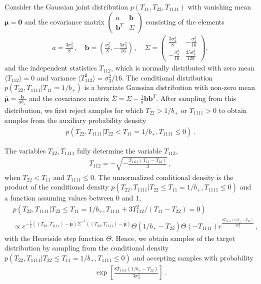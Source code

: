 \documentclass[a4paper, 11pt]{article}
\begin{document}
Consider the Gaussian joint distribution $p(T_{11},T_{22},T_{1111})$ with vanishing mean $\bm{\mu}=\bm{0}$ and the covariance matrix $\begin{pmatrix} a & \bm{b} \\ \bm{b}^T & \Sigma \end{pmatrix}$ consisting of the elements
\begin{align}
a=\frac{3 \sigma_2^2}{8}\,, \quad
\bm{b}=\left(\frac{\sigma_2^2}{8}, -\frac{5 \sigma_3^2}{16}\right)\,,\quad
\Sigma = \begin{pmatrix} \frac{3 \sigma_2^2}{8} & -\frac{\sigma_3^2}{16} \\ -\frac{\sigma_3^2}{16} & \frac{35 \sigma_4^2}{128}\end{pmatrix}, 
\end{align}
and the independent statistics $T_{112}$, which is normally distributed with zero mean $\langle T_{112}\rangle = 0$ and variance $\langle T_{112}^2\rangle = \sigma_3^2/16$. The conditional distribution $p(T_{22},T_{1111}|T_{11}=1/b_+)$ is a bivariate Gaussian distribution with non-zero mean $\bar{\bm{\mu}}=\frac{\bm{b}}{a b_+}$ and the covariance matrix $\bar{\Sigma}=\Sigma -\frac{1}{a} \bm{b}\bm{b}^T$. After sampling from this distribution, we first reject samples for which $T_{22}>1/b_+$ or $T_{1111}>0$ to obtain samples from the auxiliary probability density 
\begin{align}
p(T_{22},T_{1111}| T_{22} < T_{11}=1/b_+,T_{1111}\leq 0)\,.
\end{align}

 The variables $T_{22},T_{1111}$ fully determine the variable $T_{112}$,
\begin{align}
T_{112}= -\sqrt{-\frac{T_{1111}(T_{11}-T_{22})}{3}}\,,
\end{align}
when $T_{22} < T_{11}$ and $T_{1111}\leq 0$.  The unnormalized conditional density is the product of the conditional density $p(T_{22},T_{1111}|T_{22}\leq T_{11}=1/b_+,T_{1111}\leq 0)$ and a function assuming values between $0$ and $1$,
\begin{align}
&p(T_{22},T_{1111}|T_{22}\leq T_{11}=1/b_+, T_{1111}+3T_{112}^2/(T_{11}-T_{22}) =0)\nonumber\\
& \propto e^{-\frac{1}{2}((T_{22},T_{1111})-\bar{\bm{\mu}})\bar{\Sigma}^{-1}((T_{22},T_{1111})-\bar{\bm{\mu}}) }\Theta(1/b_+-T_{22})\Theta(-T_{1111})e^{ \frac{8T_{1111} (1/b_+ - T_{22})}{3 \sigma_3^2}}\,,
\end{align}
with the Heaviside step function $\Theta$. Hence, we obtain samples of the target distribution by sampling from the conditional density $p(T_{22},T_{1111}|T_{22}\leq T_{11}=1/b_+,T_{1111}\leq 0)$ and accepting samples with probability 
\begin{align}
\exp\left[ \frac{8T_{1111} (1/b_+ - T_{22})}{3 \sigma_3^2}\right]\,.
\end{align}
\end{document}
